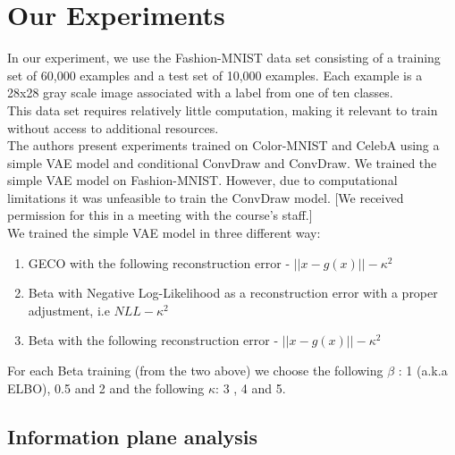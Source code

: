 \chapter*{Our Experiments}
In our experiment, we use the Fashion-MNIST data set consisting of a training set of 60,000 examples and a test set of 10,000 examples. Each example is a 28x28 gray scale image associated with a label from one of ten classes.\\
This data set requires relatively little computation, making it relevant to train without access to additional resources.\\
The authors present experiments trained on Color-MNIST and CelebA using a simple VAE model and conditional ConvDraw and ConvDraw. We trained the simple VAE model on Fashion-MNIST. However, due to computational limitations it was unfeasible to train the ConvDraw model. [We received permission for this in a meeting with the course's staff.]\\
\hfill \break
We trained the simple VAE model in three different way: \\
\begin{enumerate}
\item GECO with the following reconstruction error - $||x-g(x)||-\kappa^2$
\item Beta with Negative Log-Likelihood as a reconstruction error with a proper adjustment, i.e $NLL -\kappa^2$
\item Beta with the following reconstruction error - $||x-g(x)||-\kappa^2$ 
 \end{enumerate}
For each Beta training (from the two above) we choose the following $\beta$ : 1 (a.k.a ELBO), 0.5 and 2 and the following $\kappa$: 3 , 4 and 5. \\

\section*{Information plane analysis}

